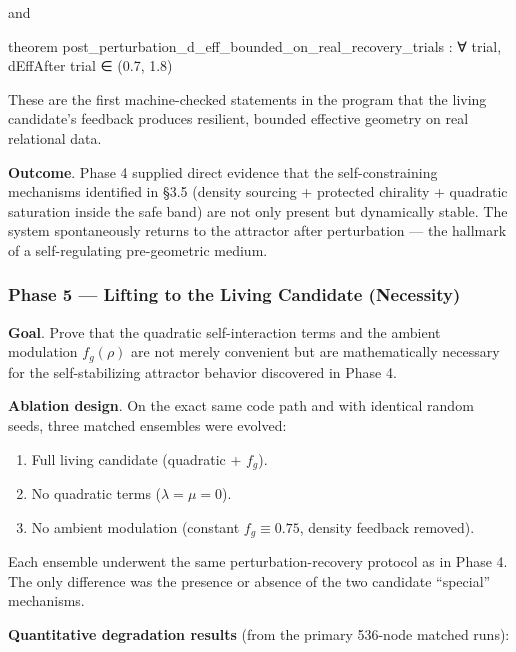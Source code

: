 \documentclass[
  11pt,
  a4paper,
]{article}
\newenvironment{Shaded}{\begin{snugshade}}{\end{snugshade}}
\newcommand{\NormalTok}[1]{#1}
\providecommand{\tightlist}{%
  \setlength{\itemsep}{0pt}\setlength{\parskip}{0pt}}
\begin{document}
and

\begin{Shaded}
\begin{Highlighting}[]
\NormalTok{theorem post\_perturbation\_d\_eff\_bounded\_on\_real\_recovery\_trials :}
\NormalTok{    ∀ trial, dEffAfter trial ∈ (0.7, 1.8)}
\end{Highlighting}
\end{Shaded}

These are the first machine-checked statements in the program that the
living candidate's feedback produces resilient, bounded effective
geometry on real relational data.

\textbf{Outcome}. Phase 4 supplied direct evidence that the
self-constraining mechanisms identified in §3.5 (density sourcing +
protected chirality + quadratic saturation inside the safe band) are not
only present but dynamically stable. The system spontaneously returns to
the attractor after perturbation --- the hallmark of a self-regulating
pre-geometric medium.

\subsubsection{Phase 5 --- Lifting to the Living Candidate
(Necessity)}\label{phase-5-lifting-to-the-living-candidate-necessity}

\textbf{Goal}. Prove that the quadratic self-interaction terms and the
ambient modulation \(f_g(\rho)\) are not merely convenient but are
mathematically necessary for the self-stabilizing attractor behavior
discovered in Phase 4.

\textbf{Ablation design}. On the exact same code path and with identical
random seeds, three matched ensembles were evolved:

\begin{enumerate}
\def\labelenumi{\arabic{enumi}.}
\tightlist
\item
  Full living candidate (quadratic + \(f_g\)).
\item
  No quadratic terms (\(\lambda = \mu = 0\)).
\item
  No ambient modulation (constant \(f_g \equiv 0.75\), density feedback
  removed).
\end{enumerate}

Each ensemble underwent the same perturbation-recovery protocol as in
Phase 4. The only difference was the presence or absence of the two
candidate ``special'' mechanisms.

\textbf{Quantitative degradation results} (from the primary 536-node
matched runs):
\end{document}
